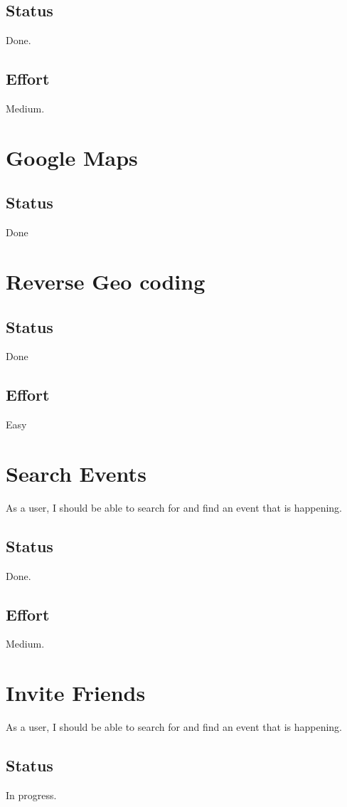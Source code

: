 \documentclass[10pt,a4paper]{article}
\begin{document}
\subsection{Status}
Done.

\subsection{Effort}
Medium.

\section{Google Maps}

\subsection{Status}
Done

\section{Reverse Geo coding}

\subsection{Status}
Done
\subsection{Effort}
Easy

\section{Search Events}
As a user, I should be able to search for and find an event that is happening.
\subsection{Status}
Done.

\subsection{Effort}
Medium.

\section{Invite Friends}
As a user, I should be able to search for and find an event that is happening.
\subsection{Status}
In progress.
\end{document}
